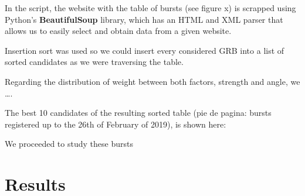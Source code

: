 In the script, the website with the table of bursts (see figure x) is scrapped using Python’s \textbf{BeautifulSoup} library, which has an HTML and XML parser that allows us to easily select and obtain data from a given website.

Insertion sort was used so we could insert every considered GRB into a list of sorted candidates as we were traversing the table. 



Regarding the distribution of weight between both factors, strength and angle, we ….

The best 10 candidates of the resulting sorted table (pie de pagina: bursts registered up to the 26th of February of 2019), is shown here:

We proceeded to study these bursts

\section{Results}
